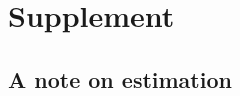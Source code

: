 \documentclass{article}
\begin{document}
\section*{Supplement}

\subsection{A note on estimation}



\end{document}
